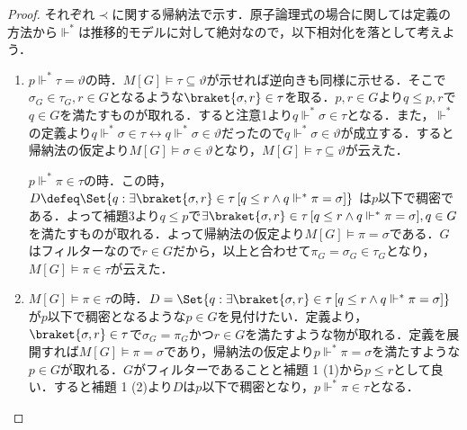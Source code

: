 \documentclass[a4j]{bxjsarticle}
\theoremstyle{definition}
\begin{document}
\begin{proof}
 それぞれ$\prec$に関する帰納法で示す．原子論理式の場合に関しては定義の方法から$\mathrel{\Vdash^*}$は推移的モデルに対して絶対なので，以下相対化を落として考えよう．
 \begin{enumerate}[label=(\alph*)]
  \item $p \mathrel{\Vdash^*} \tau =\vartheta$の時．$M[G] \models \tau \subseteq \vartheta$が示せれば逆向きも同様に示せる．そこで$\sigma_G \in \tau_G, r \in G$となるような$\braket{\sigma, r} \in \tau$を取る．$p, r \in G$より$q \leq p, r$で$q \in G$を満たすものが取れる．すると注意1より$q \mathrel{\Vdash^*} \sigma \in \tau$となる．また，$\mathrel{\Vdash^*}$の定義より$q \mathrel{\Vdash^*} \sigma \in \tau \leftrightarrow q \mathrel{\Vdash^*} \sigma \in \vartheta$だったので$q \mathrel{\Vdash^*} \sigma \in  \vartheta$が成立する．すると帰納法の仮定より$M[G] \models \sigma \in \vartheta$となり，$M[G] \models \tau \subseteq \vartheta$が云えた．

	$p \mathrel{\Vdash^*} \pi \in \tau$の時．この時，
	$D \defeq \Set{ q : \exists \braket{\sigma, r} \in \tau \,[q \leq r \wedge q \mathrel{\Vdash^*} \pi = \sigma]}$
	は$p$以下で稠密である．よって補題3より$q \leq p$で$\exists \braket{\sigma, r} \in \tau \,[q \leq r \wedge q \mathrel{\Vdash^*} \pi = \sigma], q \in G$を満たすものが取れる．よって帰納法の仮定より$M[G] \models \pi = \sigma$である．$G$はフィルターなので$r \in G$だから，以上と合わせて$\pi_G = \sigma_G \in \tau_G$となり，$M[G] \models \pi \in \tau$が云えた．
  \item $M[G] \models \pi \in \tau$の時．$D = \Set{ q : \exists \braket{\sigma, r} \in \tau \,[q \leq r \wedge q \mathrel{\Vdash^*} \pi = \sigma]}$が$p$以下で稠密となるような$p \in G$を見付けたい．定義より，$\braket{\sigma, r} \in \tau$で$\sigma_G = \pi_G$かつ$r \in G$を満たすような物が取れる．定義を展開すれば$M[G] \models \pi = \sigma$であり，帰納法の仮定より$p \mathrel{\Vdash^*} \pi = \sigma$を満たすような$p \in G$が取れる．$G$がフィルターであることと補題 1 (1)から$p \leq r$として良い．すると補題 1 (2)より$D$は$p$以下で稠密となり，$p \mathrel{\Vdash^*} \pi \in \tau$となる．


\end{enumerate}
\end{proof}
\end{document}
